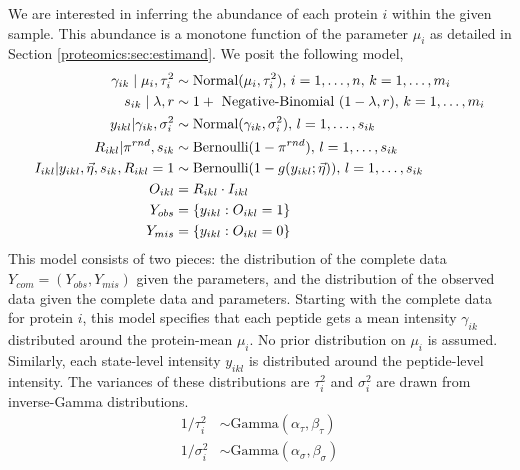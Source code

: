 We are interested in inferring the abundance of each protein $i$ within the given sample.
This abundance is a monotone function of the parameter $\mu_i$ as detailed in Section \ref{proteomics:sec:estimand}. We posit the following model,
%
\begin{align}
 \gamma_{ik}\mid\mu_{i}, \tau_{i}^2  &\sim \hbox{Normal}(\mu_{i},\tau_{i}^{2}), \, i=1,\ldots,n, \, k=1,\ldots,m_i \\
 s_{ik} \mid \lambda, r  &\sim 1+\hbox{ Negative-Binomial }(1-\lambda,r), \, k=1,\ldots,m_i \\
 y_{ikl} \vert \gamma_{ik}, \sigma_{i}^2   &\sim \hbox{Normal}(\gamma_{ik},\sigma_{i}^{2}), \, l=1,\ldots,s_{ik}\\
 R_{ikl} \vert \pi^{rnd}, s_{ik} &\sim \hbox{Bernoulli}(1 - \pi^{rnd}), \, l=1,\ldots,s_{ik} \\
 I_{ikl} \vert y_{ikl}, \vec \eta, s_{ik}, R_{ikl}=1 &\sim \hbox{Bernoulli}(1 - g(y_{ikl}; \vec \eta)), \, l=1,\ldots,s_{ik} \\
 O_{ikl} &= R_{ikl} \cdot I_{ikl} \\
 Y_{obs} &= \{y_{ikl} : O_{ikl} = 1\} \\
 Y_{mis} &= \{y_{ikl} : O_{ikl} = 0\}
\end{align}
%
This model consists of two pieces: the distribution of the complete data $Y_{com} = (Y_{obs}, Y_{mis})$ given the parameters, and the distribution of the observed data given the complete data and parameters.
Starting with the complete data for protein $i$, this model specifies that each peptide gets a mean intensity $\gamma_{ik}$ distributed around the protein-mean $\mu_i$. No prior distribution on $\mu_i$ is assumed.
Similarly, each state-level intensity $y_{ikl}$ is distributed around the peptide-level intensity.
The variances of these distributions are $\tau^2_i$ and $\sigma^2_i$ are drawn from inverse-Gamma distributions.
%
\begin{align}
1 / \tau_i^2 &\sim \text{Gamma}(\alpha_\tau, \beta_\tau) \\
1 / \sigma_i^2 &\sim \text{Gamma}(\alpha_\sigma, \beta_\sigma)
\end{align}

